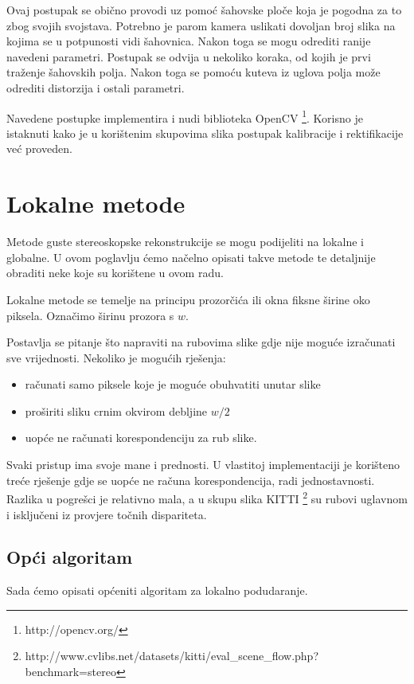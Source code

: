 \documentclass[utf8, zavrsni, numeric]{fer}
\begin{document}
Ovaj postupak se obično provodi uz pomoć šahovske ploče koja je pogodna za to zbog svojih svojstava. Potrebno je parom kamera uslikati dovoljan broj slika na kojima se u potpunosti vidi šahovnica.
Nakon toga se mogu odrediti ranije navedeni parametri. Postupak se odvija u nekoliko koraka, od kojih je prvi traženje šahovskih polja. Nakon toga se pomoću kuteva iz uglova polja može odrediti distorzija
i ostali parametri.

Navedene postupke implementira i nudi biblioteka OpenCV \footnote{http://opencv.org/}. Korisno je istaknuti kako je u korištenim skupovima slika postupak kalibracije i rektifikacije već proveden.


\chapter{Lokalne metode}
Metode guste stereoskopske rekonstrukcije se mogu podijeliti na lokalne i globalne. U ovom poglavlju ćemo načelno opisati takve metode te detaljnije obraditi neke koje su korištene u ovom radu.

Lokalne metode se temelje na principu prozorčića ili okna fiksne širine oko piksela. Označimo širinu prozora s $w$.

Postavlja se pitanje što napraviti na rubovima slike gdje nije moguće izračunati sve vrijednosti. Nekoliko je mogućih rješenja:
\begin{itemize}
  \item računati samo piksele koje je moguće obuhvatiti unutar slike
  \item proširiti sliku crnim okvirom debljine $w/2$
  \item uopće ne računati korespondenciju za rub slike.
\end{itemize}

Svaki pristup ima svoje mane i prednosti. U vlastitoj implementaciji je korišteno treće rješenje gdje se uopće ne računa korespondencija, radi jednostavnosti. Razlika u pogrešci je relativno
mala, a u skupu slika KITTI \footnote{http://www.cvlibs.net/datasets/kitti/eval\_scene\_flow.php?benchmark=stereo} su rubovi uglavnom i isključeni iz provjere točnih dispariteta.

\section{Opći algoritam}
Sada ćemo opisati općeniti algoritam za lokalno podudaranje.
\end{document}

